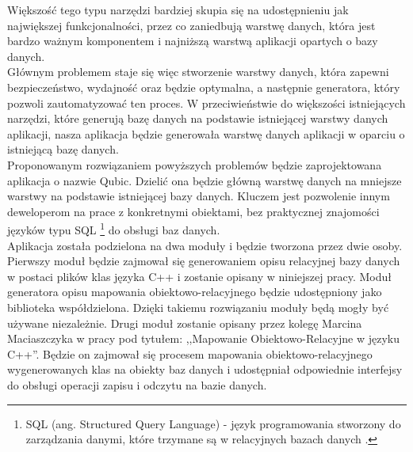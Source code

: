 \documentclass[12pt]{report}
\begin{document}
{\color{black} Większość tego typu narzędzi bardziej skupia się na udostępnieniu jak największej funkcjonalności, przez co zanied\-bują warstwę danych,
która jest bardzo ważnym komponentem i najniższą warstwą aplikacji opartych o bazy danych.} \\
	\indent Głównym problemem staje się więc stworzenie warstwy danych, która zapewni bezpieczeństwo, wydajność oraz będzie optymalna, a następnie generatora, który pozwoli zautomatyzować ten proces. W przeciwieństwie do większości istniejących narzędzi, które generują bazę danych na podstawie istniejącej warstwy danych aplikacji,
nasza aplikacja będzie generowała warstwę danych aplikacji w oparciu o istniejącą bazę danych. \\
	\indent Proponowanym rozwiązaniem powyższych problemów będzie zaprojektowana aplikacja o nazwie Qubic. Dzielić ona będzie główną warstwę danych
na mniejsze warstwy na podstawie istniejącej bazy danych. Kluczem jest pozwolenie innym deweloperom na prace z konkretnymi obiektami, bez praktycznej znajomości
języków typu SQL
	\footnote{SQL (ang. Structured Query Language) - język programowania stworzony do zarządzania danymi, które trzymane są w relacyjnych bazach danych \cite{sql}.} 
 do obsługi baz danych. \\
	\indent Aplikacja została podzielona na dwa moduły i będzie tworzona przez dwie osoby. Pierwszy moduł będzie zajmował się generowaniem opisu relacyjnej bazy danych w postaci plików klas języka C++ i zostanie opisany w niniejszej pracy. Moduł generatora opisu mapowania obiektowo-relacyjnego będzie udostępniony jako biblioteka współdzielona. Dzięki takiemu rozwiązaniu moduły będą mogły być używane niezależnie. Drugi moduł zostanie opisany przez kolegę Marcina Maciaszczyka w pracy pod tytułem: ,,Mapowanie Obiektowo-Relacyjne w języku C++''.  Będzie on zajmował się procesem mapowania 
obiektowo-relacyjnego wygenerowanych klas na obiekty baz danych i udostępniał
odpowiednie interfejsy do obsługi operacji  zapisu i odczytu na bazie danych.
\end{document}
